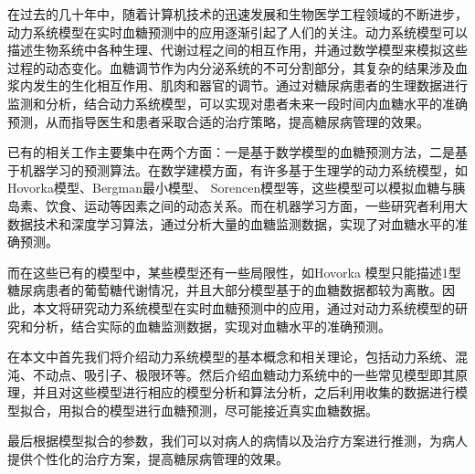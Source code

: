 在过去的几十年中，随着计算机技术的迅速发展和生物医学工程领域的不断进步，动力系统模型在实时血糖预测中的应用逐渐引起了人们的关注。动力系统模型可以描述生物系统中各种生理、代谢过程之间的相互作用，并通过数学模型来模拟这些过程的动态变化\cite{cobelli2009diabetes}。血糖调节作为内分泌系统的不可分割部分，其复杂的结果涉及血浆内发生的生化相互作用、肌肉和器官的调节\cite{zavala2019mathematical}。通过对糖尿病患者的生理数据进行监测和分析，结合动力系统模型，可以实现对患者未来一段时间内血糖水平的准确预测，从而指导医生和患者采取合适的治疗策略，提高糖尿病管理的效果。

已有的相关工作主要集中在两个方面：一是基于数学模型的血糖预测方法，二是基于机器学习的预测算法。在数学建模方面，有许多基于生理学的动力系统模型，如Hovorka模型、Bergman最小模型、 Sorencen模型等\cite{pompa2021comparison,mari2001model,de2000mathematical}，这些模型可以模拟血糖与胰岛素、饮食、运动等因素之间的动态关系。而在机器学习方面，一些研究者利用大数据技术和深度学习算法，通过分析大量的血糖监测数据，实现了对血糖水平的准确预测。

而在这些已有的模型中，某些模型还有一些局限性，如Hovorka 模型只能描述1型糖尿病患者的葡萄糖代谢情况，并且大部分模型基于的血糖数据都较为离散。因此，本文将研究动力系统模型在实时血糖预测中的应用，通过对动力系统模型的研究和分析，结合实际的血糖监测数据，实现对血糖水平的准确预测。

在本文中首先我们将介绍动力系统模型的基本概念和相关理论，包括动力系统、混沌、不动点、吸引子、极限环等。然后介绍血糖动力系统中的一些常见模型即其原理，并且对这些模型进行相应的模型分析和算法分析，之后利用收集的数据进行模型拟合，用拟合的模型进行血糖预测，尽可能接近真实血糖数据。

最后根据模型拟合的参数，我们可以对病人的病情以及治疗方案进行推测，为病人提供个性化的治疗方案，提高糖尿病管理的效果。